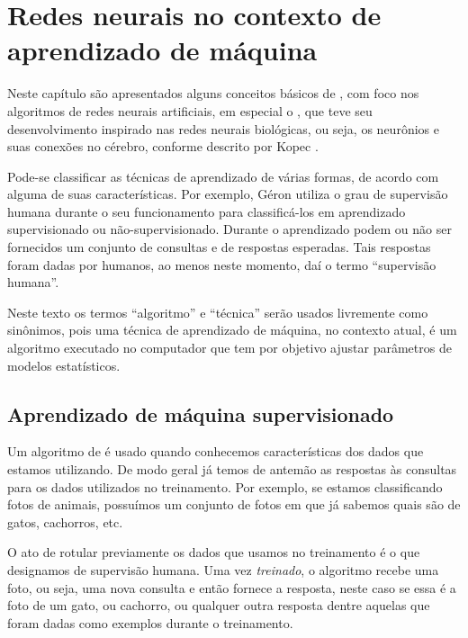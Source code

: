 
\chapter{Redes neurais no contexto de aprendizado de máquina}
\label{cap:redes}

Neste capítulo são apresentados alguns conceitos básicos de , com foco nos algoritmos de redes neurais artificiais, em especial o , que teve seu desenvolvimento inspirado nas redes neurais biológicas, ou seja, os neurônios e suas conexões no cérebro, conforme descrito por Kopec \citep{classic}.

Pode-se classificar as técnicas de aprendizado de várias formas, de acordo com alguma de suas características. Por exemplo, Géron \citep{hands} utiliza o grau de supervisão humana durante o seu funcionamento para classificá-los em aprendizado supervisionado ou não-supervisionado. Durante o aprendizado podem ou não ser fornecidos um conjunto de consultas e de respostas esperadas. Tais respostas foram dadas por humanos, ao menos neste momento, daí o termo ``supervisão humana''.

Neste texto os termos ``algoritmo'' e ``técnica'' serão usados livremente como sinônimos, pois uma técnica de aprendizado de máquina, no contexto atual, é um algoritmo executado no computador que tem por objetivo ajustar parâmetros de modelos estatísticos.

\section{Aprendizado de máquina supervisionado}

 Um algoritmo de  é usado quando conhecemos características dos dados que estamos utilizando. De modo geral já temos de antemão as respostas às consultas para os dados utilizados no treinamento. Por exemplo, se estamos classificando fotos de animais, possuímos um conjunto de fotos em que já sabemos quais são de gatos, cachorros, etc.

 O ato de rotular previamente os dados que usamos no treinamento é o que designamos de supervisão humana. Uma vez \emph{treinado}, o algoritmo recebe uma foto, ou seja, uma nova consulta e então fornece a resposta, neste caso se essa é a foto de um gato, ou cachorro, ou qualquer outra resposta dentre aquelas que foram dadas como exemplos durante o treinamento.

